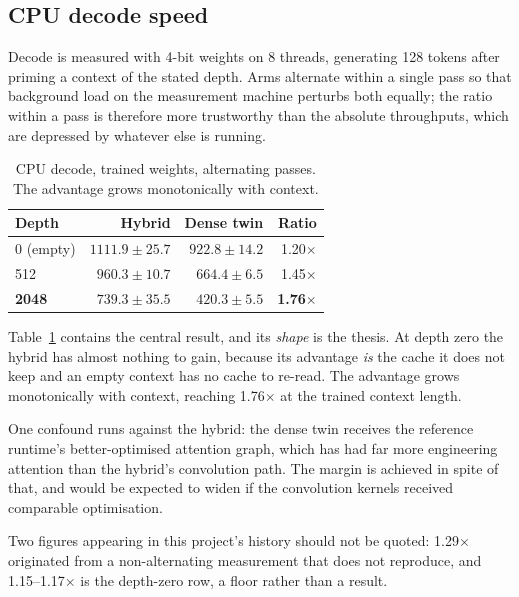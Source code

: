 \documentclass[conference]{IEEEtran}
\begin{document}
\subsection{CPU decode speed}
\label{sec:decode}

Decode is measured with 4-bit weights on 8 threads, generating 128 tokens after
priming a context of the stated depth. Arms alternate within a single pass so
that background load on the measurement machine perturbs both equally; the
ratio within a pass is therefore more trustworthy than the absolute
throughputs, which are depressed by whatever else is running.

\begin{table}[t]
\caption{CPU decode, trained weights, alternating passes. The advantage grows
monotonically with context.}
\label{tab:decode}
\centering
\begin{tabular}{@{}lrrr@{}}
\toprule
\textbf{Depth} & \textbf{Hybrid} & \textbf{Dense twin} & \textbf{Ratio} \\
\midrule
0 (empty)    & $1111.9 \pm 25.7$ & $922.8 \pm 14.2$ & 1.20$\times$ \\
512          & $960.3 \pm 10.7$  & $664.4 \pm 6.5$  & 1.45$\times$ \\
\textbf{2048} & $\mathbf{739.3 \pm 35.5}$ & $\mathbf{420.3 \pm 5.5}$ & \textbf{1.76$\times$} \\
\bottomrule
\end{tabular}
\end{table}

Table~\ref{tab:decode} contains the central result, and its \emph{shape} is the
thesis. At depth zero the hybrid has almost nothing to gain, because its
advantage \emph{is} the cache it does not keep and an empty context has no cache
to re-read. The advantage grows monotonically with context, reaching
1.76$\times$ at the trained context length.

One confound runs against the hybrid: the dense twin receives the reference
runtime's better-optimised attention graph, which has had far more engineering
attention than the hybrid's convolution path. The margin is achieved in spite of
that, and would be expected to widen if the convolution kernels received
comparable optimisation.

Two figures appearing in this project's history should not be quoted:
1.29$\times$ originated from a non-alternating measurement that does not
reproduce, and 1.15--1.17$\times$ is the depth-zero row, a floor rather than a
result.
\end{document}
